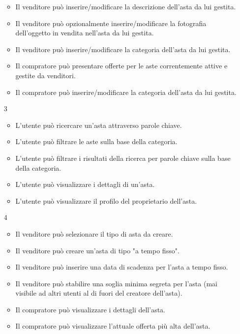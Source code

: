 \begin{itemize}
\begin{itemize}
                \item Il venditore può inserire/modificare la descrizione dell'asta da lui gestita.
                \item Il venditore può opzionalmente inserire/modificare la fotografia dell'oggetto in vendita nell'asta da lui gestita.
                \item Il venditore può inserire/modificare la categoria dell'asta da lui gestita.
                \item Il compratore può presentare offerte per le aste correntemente attive e gestite da venditori.                
                \item Il compratore può inserire/modificare la categoria dell'asta da lui gestita.
            \end{itemize} %
            \item[3]
            \begin{itemize} %
                \item L'utente può ricercare un'asta attraverso parole chiave.
                \item L'utente può filtrare le aste sulla base della categoria.
                \item L’utente può filtrare i risultati della ricerca per parole chiave sulla base della categoria.
                \item L'utente può visualizzare i dettagli di un'asta.
                \item L'utente può visualizzare il profilo del proprietario dell'asta.
            \end{itemize} %
            \item[4]
            \begin{itemize} %
                \item Il venditore può selezionare il tipo di asta da creare.
                \item Il venditore può creare un'asta di tipo "a tempo fisso".
                \item Il venditore può inserire una data di scadenza per l'asta a tempo fisso.
                \item Il venditore può stabilire una soglia minima segreta per l'asta (mai visibile ad altri utenti al di fuori del creatore dell'asta).
                \item Il compratore può visualizzare i dettagli dell'asta.
                \item Il compratore può visualizzare l'attuale offerta più alta dell'asta.

\end{itemize}
\end{itemize}
